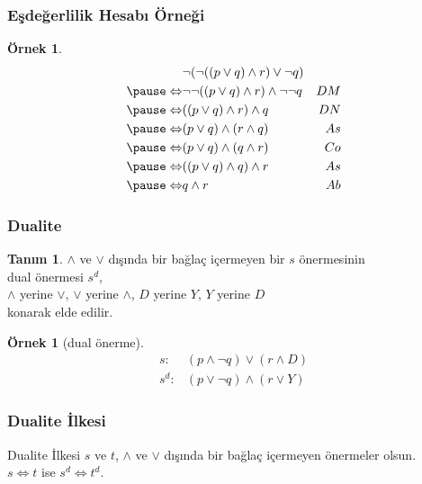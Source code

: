 \documentclass[dvipsnames]{beamer}
\theoremstyle{definition}
\newtheorem{tanim}[theorem]{Tanım}
\theoremstyle{example}
\newtheorem{ornek}[theorem]{Örnek}
\theoremstyle{plain}
\begin{document}
\begin{frame}
  \frametitle{Eşdeğerlilik Hesabı Örneği}

  \begin{ornek}
    \begin{eqnarray*}
                      & \neg (\neg ((p \vee q) \wedge r) \vee \neg q)      &   \\
      \pause
      \Leftrightarrow & \neg \neg ((p \vee q) \wedge r) \wedge \neg \neg q & DM\\
      \pause
      \Leftrightarrow & ((p \vee q) \wedge r) \wedge q                     & DN\\
      \pause
      \Leftrightarrow & (p \vee q) \wedge (r \wedge q)                     & As\\
      \pause
      \Leftrightarrow & (p \vee q) \wedge (q \wedge r)                     & Co\\
      \pause
      \Leftrightarrow & ((p \vee q) \wedge q) \wedge r                     & As\\
      \pause
      \Leftrightarrow & q \wedge r                                         & Ab
    \end{eqnarray*}
  \end{ornek}
\end{frame}

\begin{frame}
  \frametitle{Dualite}

  \begin{tanim}
    $\wedge$ ve $\vee$ dışında bir bağlaç içermeyen bir $s$ önermesinin\\
    \alert{dual} önermesi $s^d$,\\
    $\wedge$ yerine $\vee$, $\vee$ yerine $\wedge$,
    $D$ yerine $Y$, $Y$ yerine $D$\\
    konarak elde edilir.
  \end{tanim}

  \pause
  \begin{ornek}[dual önerme]
    \begin{eqnarray*}
      s:   & (p \wedge \neg q) \vee (r \wedge D)\\
      s^d: & (p \vee \neg q) \wedge (r \vee Y)
    \end{eqnarray*}
  \end{ornek}
\end{frame}

\begin{frame}
  \frametitle{Dualite İlkesi}

  \begin{block}{Dualite İlkesi}
    $s$ ve $t$, $\wedge$ ve $\vee$ dışında bir bağlaç içermeyen önermeler
    olsun.\\
    $s \Leftrightarrow t$ ise $s^d \Leftrightarrow t^d$.
  \end{block}
\end{frame}
\end{document}
